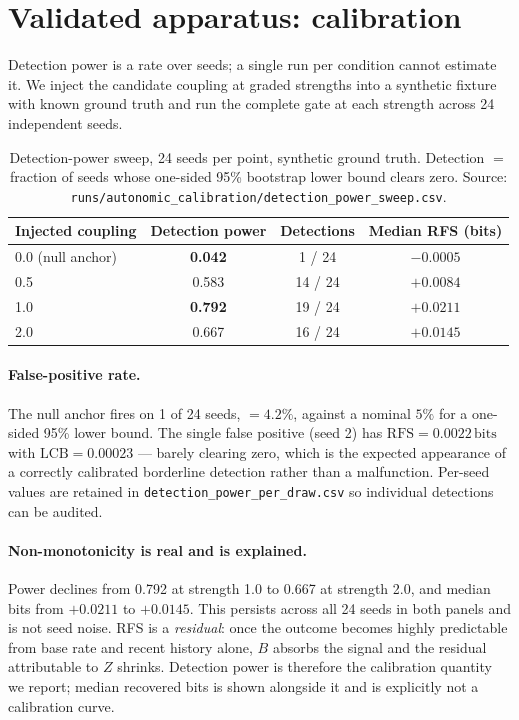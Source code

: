 \documentclass[11pt]{article}
\newcommand{\bits}{\,\mathrm{bits}}
\begin{document}
\section{Validated apparatus: calibration}
\label{sec:calib}

Detection power is a rate over seeds; a single run per condition cannot estimate
it. We inject the candidate coupling at graded strengths into a synthetic fixture
with known ground truth and run the complete gate at each strength across
24 independent seeds.

\begin{table}[h]
\centering
\small
\caption{Detection-power sweep, 24 seeds per point, synthetic ground truth.
Detection $=$ fraction of seeds whose one-sided 95\% bootstrap lower bound clears
zero. Source: \texttt{runs/autonomic\_calibration/detection\_power\_sweep.csv}.}
\begin{tabular}{@{}lccc@{}}
\toprule
Injected coupling & Detection power & Detections & Median RFS (bits) \\
\midrule
0.0 (null anchor) & \textbf{0.042} & 1 / 24 & $-0.0005$ \\
0.5 & 0.583 & 14 / 24 & $+0.0084$ \\
1.0 & \textbf{0.792} & 19 / 24 & $+0.0211$ \\
2.0 & 0.667 & 16 / 24 & $+0.0145$ \\
\bottomrule
\end{tabular}
\end{table}

\paragraph{False-positive rate.} The null anchor fires on 1 of 24 seeds,
$= 4.2\%$, against a nominal $5\%$ for a one-sided 95\% lower bound. The single
false positive (seed 2) has $\mathrm{RFS} = 0.0022\bits$ with
$\mathrm{LCB} = 0.00023$ --- barely clearing zero, which is the expected
appearance of a correctly calibrated borderline detection rather than a
malfunction. Per-seed values are retained in
\texttt{detection\_power\_per\_draw.csv} so individual detections can be audited.

\paragraph{Non-monotonicity is real and is explained.} Power declines from 0.792
at strength 1.0 to 0.667 at strength 2.0, and median bits from $+0.0211$ to
$+0.0145$. This persists across all 24 seeds in both panels and is not seed noise.
RFS is a \emph{residual}: once the outcome becomes highly predictable from base
rate and recent history alone, $B$ absorbs the signal and the residual
attributable to $Z$ shrinks. Detection power is therefore the calibration
quantity we report; median recovered bits is shown alongside it and is explicitly
not a calibration curve.
\end{document}
